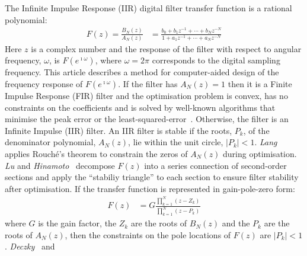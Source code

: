 \documentclass[a4paper,twoside,10pt,english]{article}
\begin{document}
The Infinite Impulse Response (IIR) digital filter transfer function is
a rational polynomial:
\begin{align}
  F\left(z\right) = \frac{B_{N}\left(z\right)}{A_{N}\left(z\right)}
  &= \frac{b_{0}+b_{1}z^{-1}+\cdots + b_{N}z^{-N}}
    {1+a_{1}z^{-1} + \cdots + a_{N}z^{-N}}
\label{eqn:Transfer-function-F}
\end{align}
Here $z$ is a complex number and the response of the filter with respect to
angular frequency, $\omega$, is $F\left(e^{\imath\omega}\right)$, where
$\omega=2\pi$ corresponds to the digital sampling frequency. 
This article describes a method for computer-aided design of the frequency
response of $F\left(e^{\imath\omega}\right)$. If the filter has
$A_{N}\left(z\right)=1$ then it is a Finite Impulse Response (FIR) filter and
the optimisation problem is convex, has no constraints on the coefficients and
is solved by well-known algorithms that minimise the peak error or the
least-squared-error~\cite{Medlin_LagrangeMultiplierFIRMultirate,SelesnickBurrus_ExchangeAlgorithmsLinearPhaseFIRFilters,SelesnickLangBurrus_ConstrainedLeastSquareFIRFilters,SelesnickLangBurrus_ConstrainedLeastSquareMultiBandFIRFilters,McClellanParks_ComputerProgramFIRLinearPhaseFilters,Iwasaki_GeneralizedKYPFrequencyDomainInequalities,Davidson_LMISpectralConstraints,ParksMcClellan_ChebyshevApproxNonRecursiveDigitalFilters}.
Otherwise, the filter is an Infinite Impulse (IIR) filter. An IIR filter is
stable if the roots, $P_{k}$, of the denominator polynomial,
$A_{N}\left(z\right)$, lie within the unit circle, $\left|P_{k}\right|<1$.
\emph{Lang}~\cite{Lang_LSDesignIIRDigitalFiltersPoleRadiusConstraint} applies
Rouch\'{e}'s theorem to constrain the zeros of $A_{N}\left(z\right)$ during
optimisation. \emph{Lu} and
\emph{Hinamoto}~\cite{LuHinamoto_IIRRobustStabilityQuadraticProgramming}
decompose $F\left(z\right)$ into a series connection of second-order sections
and apply the ``stabiliy triangle'' to each section to ensure filter stability
after optimisation. If the transfer function is represented in gain-pole-zero
form:
\begin{align*}
  F\left(z\right)&= G\frac{\prod_{k=1}^{N}\left(z-Z_{k}\right)}
                   {\prod_{k=1}^{N}\left(z-P_{k}\right)}
\end{align*}
where $G$ is the gain factor, the $Z_{k}$ are the roots of $B_{N}\left(z\right)$
and the $P_{k}$ are the roots of $A_{N}\left(z\right)$, then the constraints on
the pole locations of $F\left(z\right)$ are $\left|P_{k}\right|<1$. 
\emph{Deczky}~\cite{Deczky_MinPSynthesisIIRDigitalFilters} and
\end{document}
